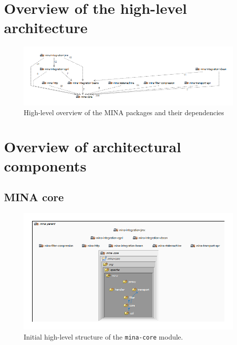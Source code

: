 \section{Overview of the high-level architecture}

\begin{landscape}
\begin{figure}
    \centering
    \includegraphics[scale=0.9]{images/MINA_package_dependencies.png}
    \caption{High-level overview of the MINA packages and their dependencies}
    \label{fig:overview_package_dependencies}
\end{figure}
\end{landscape}

\section{Overview of architectural components}
\subsection{MINA core}
\begin{figure}[H]
    \centering
    \includegraphics[width=\textwidth]{images/MINA_core_initial.png}
    \caption{Initial high-level structure of the \texttt{mina-core} module.}
    \label{fig:mina_core_initial}
\end{figure}

